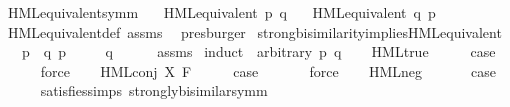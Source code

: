 \begin{isabellebody}
\isamarkupfalse%
\ HML{\isacharunderscore}{\kern0pt}equivalent{\isacharunderscore}{\kern0pt}symm{\isacharcolon}{\kern0pt}\isanewline
\ \ \ {\isacartoucheopen}HML{\isacharunderscore}{\kern0pt}equivalent\ p\ q{\isacartoucheclose}\isanewline
\ \ \ {\isacartoucheopen}HML{\isacharunderscore}{\kern0pt}equivalent\ q\ p{\isacartoucheclose}\isanewline
%
\isadelimproof
\ \ %
\endisadelimproof
%
\isatagproof
{}\isamarkupfalse%
\ HML{\isacharunderscore}{\kern0pt}equivalent{\isacharunderscore}{\kern0pt}def\ assms\ \isamarkupfalse%
\ presburger%
\endisatagproof
{\isafoldproof}%
%
\isadelimproof
\isanewline
%
\endisadelimproof
\isanewline
{}\isamarkupfalse%
\ strong{\isacharunderscore}{\kern0pt}bisimilarity{\isacharunderscore}{\kern0pt}implies{\isacharunderscore}{\kern0pt}HML{\isacharunderscore}{\kern0pt}equivalent{\isacharcolon}{\kern0pt}\isanewline
\ \ \ {\isacartoucheopen}p\ {\isasymleftrightarrow}\ q{\isacartoucheclose}\ {\isacartoucheopen}p\ {\isasymTurnstile}\ {\isasymphi}{\isacartoucheclose}\isanewline
\ \ \ {\isacartoucheopen}q\ {\isasymTurnstile}\ {\isasymphi}{\isacartoucheclose}\isanewline
%
\isadelimproof
\ \ %
\endisadelimproof
%
\isatagproof
{}\isamarkupfalse%
\ assms\isanewline
{}\isamarkupfalse%
\ {\isacharparenleft}{\kern0pt}induct\ {\isasymphi}\ arbitrary{\isacharcolon}{\kern0pt}\ p\ q{\isacharparenright}{\kern0pt}\isanewline
\ \ \isamarkupfalse%
\ HML{\isacharunderscore}{\kern0pt}true\isanewline
\ \ \isamarkupfalse%
\ \isamarkupfalse%
\ {\isacharquery}{\kern0pt}case\ \isanewline
\ \ \ \ \isamarkupfalse%
\ force\isanewline
{}\isamarkupfalse%
\isanewline
\ \ \isamarkupfalse%
\ {\isacharparenleft}{\kern0pt}HML{\isacharunderscore}{\kern0pt}conj\ X\ F{\isacharparenright}{\kern0pt}\isanewline
\ \ \isamarkupfalse%
\ \isamarkupfalse%
\ {\isacharquery}{\kern0pt}case\ \isanewline
\ \ \ \ \isamarkupfalse%
\ force\isanewline
{}\isamarkupfalse%
\isanewline
\ \ \isamarkupfalse%
\ {\isacharparenleft}{\kern0pt}HML{\isacharunderscore}{\kern0pt}neg\ {\isasymphi}{\isacharparenright}{\kern0pt}\isanewline
\ \ \isamarkupfalse%
\ \isamarkupfalse%
\ {\isacharquery}{\kern0pt}case\isanewline
\ \ \ \ \isamarkupfalse%
\ satisfies{\isachardot}{\kern0pt}simps{\isacharparenleft}{\kern0pt}{}{\isacharparenright}{\kern0pt}\ strongly{\isacharunderscore}{\kern0pt}bisimilar{\isacharunderscore}{\kern0pt}symm\ \isamarkupfalse%

\end{isabellebody}
